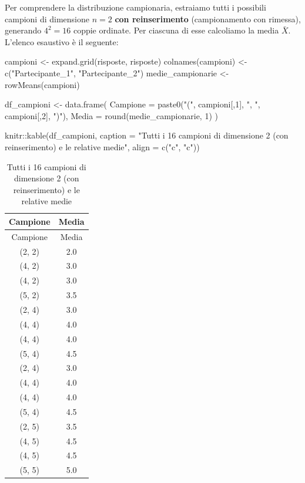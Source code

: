 \documentclass[
  italian,
  letterpaper,
  a4paper,
  11pt,
  open=any]{scrbook}
\newenvironment{Shaded}{\begin{snugshade}}{\end{snugshade}}
\newcommand{\AttributeTok}[1]{\textcolor[rgb]{0.40,0.45,0.13}{#1}}
\newcommand{\DecValTok}[1]{\textcolor[rgb]{0.68,0.00,0.00}{#1}}
\newcommand{\FunctionTok}[1]{\textcolor[rgb]{0.28,0.35,0.67}{#1}}
\newcommand{\NormalTok}[1]{\textcolor[rgb]{0.00,0.23,0.31}{#1}}
\newcommand{\OtherTok}[1]{\textcolor[rgb]{0.00,0.23,0.31}{#1}}
\newcommand{\SpecialCharTok}[1]{\textcolor[rgb]{0.37,0.37,0.37}{#1}}
\newcommand{\StringTok}[1]{\textcolor[rgb]{0.13,0.47,0.30}{#1}}
\theoremstyle{plain}
\theoremstyle{definition}
\theoremstyle{definition}
\theoremstyle{remark}
\begin{document}
Per comprendere la distribuzione campionaria, estraiamo tutti i
possibili campioni di dimensione \(n = 2\) \textbf{con reinserimento}
(campionamento con rimessa), generando \(4^2 = 16\) coppie ordinate. Per
ciascuna di esse calcoliamo la media \(\bar{X}\). L'elenco esaustivo è
il seguente:

\begin{Shaded}
\begin{Highlighting}[]
\NormalTok{campioni }\OtherTok{\textless{}{-}} \FunctionTok{expand.grid}\NormalTok{(risposte, risposte)}
\FunctionTok{colnames}\NormalTok{(campioni) }\OtherTok{\textless{}{-}} \FunctionTok{c}\NormalTok{(}\StringTok{"Partecipante\_1"}\NormalTok{, }\StringTok{"Partecipante\_2"}\NormalTok{)}
\NormalTok{medie\_campionarie }\OtherTok{\textless{}{-}} \FunctionTok{rowMeans}\NormalTok{(campioni)}

\NormalTok{df\_campioni }\OtherTok{\textless{}{-}} \FunctionTok{data.frame}\NormalTok{(}
  \AttributeTok{Campione =} \FunctionTok{paste0}\NormalTok{(}\StringTok{"("}\NormalTok{, campioni[,}\DecValTok{1}\NormalTok{], }\StringTok{", "}\NormalTok{, campioni[,}\DecValTok{2}\NormalTok{], }\StringTok{")"}\NormalTok{),}
  \AttributeTok{Media =} \FunctionTok{round}\NormalTok{(medie\_campionarie, }\DecValTok{1}\NormalTok{)}
\NormalTok{)}

\NormalTok{knitr}\SpecialCharTok{::}\FunctionTok{kable}\NormalTok{(df\_campioni, }
             \AttributeTok{caption =} \StringTok{"Tutti i 16 campioni di dimensione 2 (con reinserimento) e le relative medie"}\NormalTok{,}
             \AttributeTok{align =} \FunctionTok{c}\NormalTok{(}\StringTok{"c"}\NormalTok{, }\StringTok{"c"}\NormalTok{))}
\end{Highlighting}
\end{Shaded}

\begin{longtable}[]{@{}cc@{}}
\caption{Tutti i 16 campioni di dimensione 2 (con reinserimento) e le
relative medie}\tabularnewline
\toprule\noalign{}
Campione & Media \\
\midrule\noalign{}
\endfirsthead
\toprule\noalign{}
Campione & Media \\
\midrule\noalign{}
\endhead
\bottomrule\noalign{}
\endlastfoot
(2, 2) & 2.0 \\
(4, 2) & 3.0 \\
(4, 2) & 3.0 \\
(5, 2) & 3.5 \\
(2, 4) & 3.0 \\
(4, 4) & 4.0 \\
(4, 4) & 4.0 \\
(5, 4) & 4.5 \\
(2, 4) & 3.0 \\
(4, 4) & 4.0 \\
(4, 4) & 4.0 \\
(5, 4) & 4.5 \\
(2, 5) & 3.5 \\
(4, 5) & 4.5 \\
(4, 5) & 4.5 \\
(5, 5) & 5.0 \\
\end{longtable}
\end{document}
